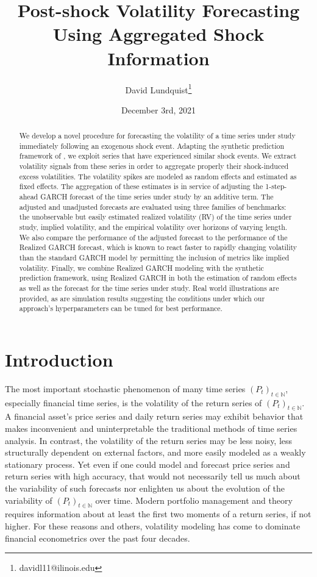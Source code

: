 \documentclass[11pt]{article}
\title{Post-shock Volatility Forecasting Using Aggregated Shock Information}
\author{David Lundquist\thanks{davidl11@ilinois.edu} }
\affil{Department of Statistics, University of Illinois at Urbana-Champaign}
\date{December 3rd, 2021}
\theoremstyle{definition}
\begin{document}
\maketitle

\begin{abstract}
We develop a novel procedure for forecasting the volatility of a time series under study immediately following an exogenous shock event.  Adapting the synthetic prediction framework of \citet{lin2021minimizing}, we exploit series that have experienced similar shock events.  We extract volatility signals from these series in order to aggregate properly their shock-induced excess volatilities.  The volatility spikes are modeled as random effects and estimated as fixed effects.  The aggregation of these estimates is in service of adjusting the 1-step-ahead GARCH forecast of the time series under study by an additive term.  The adjusted and unadjusted forecasts are evaluated using three families of benchmarks: the unobservable but easily estimated realized volatility (RV) of the time series under study, implied volatility, and the empirical volatility over horizons of varying length.  We also compare the performance of the adjusted forecast to the performance of the Realized GARCH forecast, which is known to react faster to rapidly changing volatility than the standard GARCH model by permitting the inclusion of metrics like implied volatility.   Finally, we combine Realized GARCH modeling with the synthetic prediction framework, using Realized GARCH in both the estimation of random effects as well as the forecast for the time series under study.  Real world illustrations are provided, as are simulation results suggesting the conditions under which our approach's hyperparameters can be tuned for best performance.
\end{abstract}


\section{Introduction}

The most important stochastic phenomenon of many time series $(P_{t})_{t\in\mathbb{N}}$, especially financial time series, is the volatility of the return series of $(P_{t})_{t\in\mathbb{N}}$.  A financial asset's price series and daily return series may exhibit behavior that makes inconvenient and uninterpretable the traditional methods of time series analysis.  In contrast, the volatility of the return series may be less noisy, less structurally dependent on external factors, and more easily modeled as a weakly stationary process.  Yet even if one could model and forecast price series and return series with high accuracy, that would not necessarily tell us much about the variability of such forecasts nor enlighten us about the evolution of the variability of $(P_{t})_{t\in\mathbb{N}}$ over time. Modern portfolio management and theory requires information about at least the first two moments of a return series, if not higher.  For these reasons and others, volatility modeling has come to dominate financial econometrics over the past four decades.  
\end{document}
